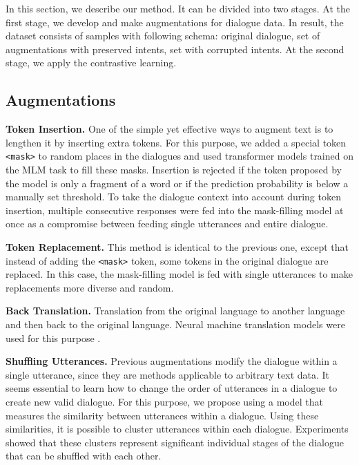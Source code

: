 \documentclass{article}
\begin{document}
In this section, we describe our method. It can be divided into two stages. At the first stage, we develop and make augmentations for dialogue data. In result, the dataset consists of samples with following schema: original dialogue, set of augmentations with preserved intents, set with corrupted intents. At the second stage, we apply the contrastive learning.

\subsection{Augmentations} \label{sec:aug}

\textbf{Token Insertion.} One of the simple yet effective ways to augment text is to lengthen it by inserting extra tokens. For this purpose, we added a special token \texttt{<mask>} to random places in the dialogues and used transformer models trained on the MLM task \cite{devlin2019bert} to fill these masks. Insertion is rejected if the token proposed by the model is only a fragment of a word \cite{wu2016googles, sennrich-etal-2016-neural} or if the prediction probability is below a manually set threshold. To take the dialogue context into account during token insertion, multiple consecutive responses were fed into the mask-filling model at once as a compromise between feeding single utterances and entire dialogue.

\textbf{Token Replacement.} This method is identical to the previous one, except that instead of adding the \texttt{<mask>} token, some tokens in the original dialogue are replaced. In this case, the mask-filling model is fed with single utterances to make replacements more diverse and random.

\textbf{Back Translation.} Translation from the original language to another language and then back to the original language. Neural machine translation models were used for this purpose \cite{TiedemannThottingal}.

\textbf{Shuffling Utterances.} Previous augmentations modify the dialogue within a single utterance, since they are methods applicable to arbitrary text data. It seems essential to learn how to change the order of utterances in a dialogue to create new valid dialogue. For this purpose, we propose using a model that measures the similarity between utterances within a dialogue. Using these similarities, it is possible to cluster utterances within each dialogue. Experiments showed that these clusters represent significant individual stages of the dialogue that can be shuffled with each other.
\end{document}
